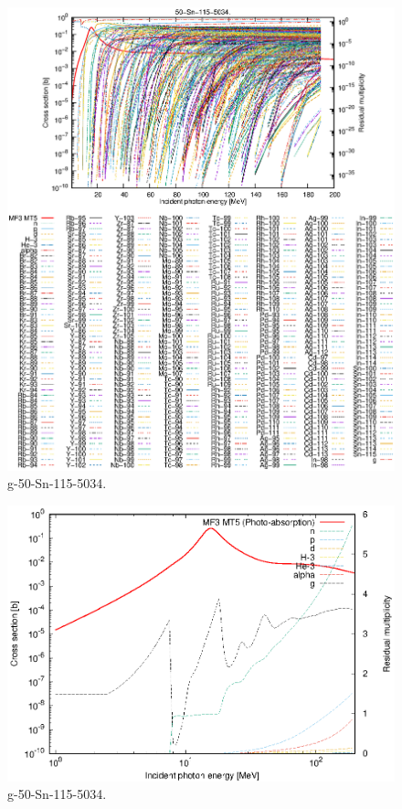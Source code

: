 \begin{figure}
 \includegraphics[width=\linewidth]{eps/g_50-Sn-115_5034.eps}
  \caption{g-50-Sn-115-5034.}
\end{figure}
\newpage \clearpage

\begin{figure}
 \includegraphics[width=\linewidth]{eps-log/g_50-Sn-115_5034.eps}
 \caption{g-50-Sn-115-5034.}
\end{figure}
\newpage \clearpage

